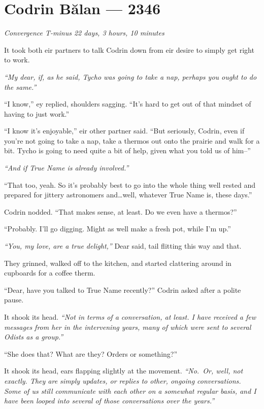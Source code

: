 \hypertarget{codrin-bux103lan-2346}{%
\chapter{Codrin Bălan — 2346}}

\begin{center}
\vspace{-1.5em}
\emph{Convergence T-minus 22 days, 3 hours, 10 minutes}
\end{center}

\noindent It took both eir partners to talk Codrin down from eir desire to simply get right to work.

\emph{``My dear, if, as he said, Tycho was going to take a nap, perhaps you ought to do the same.''}

``I know,'' ey replied, shoulders sagging. ``It's hard to get out of that mindset of having to just work.''

``I know it's enjoyable,'' eir other partner said. ``But seriously, Codrin, even if you're not going to take a nap, take a thermos out onto the prairie and walk for a bit. Tycho is going to need quite a bit of help, given what you told us of him--''

\emph{``And if True Name is already involved.''}

``That too, yeah. So it's probably best to go into the whole thing well rested and prepared for jittery astronomers and\ldots well, whatever True Name is, these days.''

Codrin nodded. ``That makes sense, at least. Do we even have a thermos?''

``Probably. I'll go digging. Might as well make a fresh pot, while I'm up.''

\emph{``You, my love, are a true delight,''} Dear said, tail flitting this way and that.

They grinned, walked off to the kitchen, and started clattering around in cupboards for a coffee therm.

``Dear, have you talked to True Name recently?'' Codrin asked after a polite pause.

It shook its head. \emph{``Not in terms of a conversation, at least. I have received a few messages from her in the intervening years, many of which were sent to several Odists as a group.''}

``She does that? What are they? Orders or something?''

It shook its head, ears flapping slightly at the movement. \emph{``No.~Or, well, not exactly. They are simply updates, or replies to other, ongoing conversations. Some of us still communicate with each other on a somewhat regular basis, and I have been looped into several of those conversations over the years.''}

